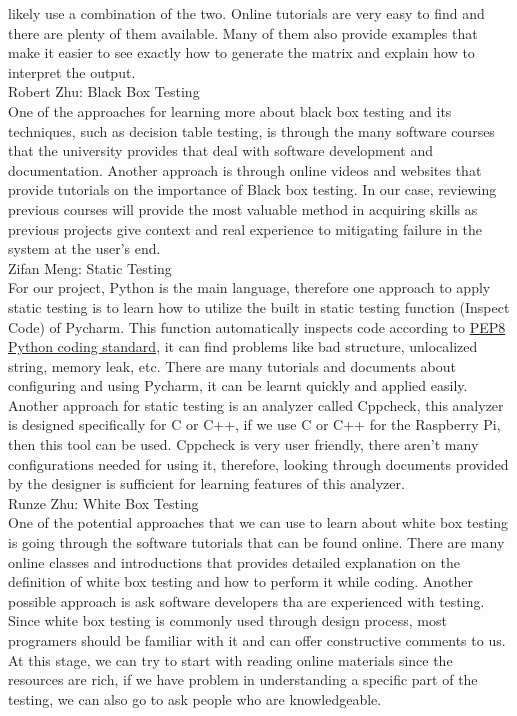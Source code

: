 \documentclass[12pt]{article}
\begin{document}
\begin{outline}[enumerate]
    likely use a combination of the two. Online tutorials are very easy to find and there are plenty of them available. Many of them also provide examples that make it 
    easier to see exactly how to generate the matrix and explain how to interpret the output.\\
    \2 Robert Zhu: Black Box Testing\\
    One of the approaches for learning more about black box testing and its techniques, such as decision table testing, is through the many software courses that the university 
    provides that deal with software development and documentation. Another approach is through online videos and websites that provide tutorials on the importance of Black box testing. 
    In our case, reviewing previous courses will provide the most valuable method in acquiring skills as previous projects give context and real experience to mitigating failure in 
    the system at the user’s end.\\
    \2 Zifan Meng: Static Testing\\
    For our project, Python is the main language, therefore one approach to apply static testing is to learn how to utilize the built in static testing function (Inspect Code) of Pycharm. This function automatically inspects code according to \href{https://peps.python.org/pep-0008/}{PEP8 Python coding standard}, it can find problems like bad structure, unlocalized string, memory leak, etc. There are many tutorials and documents about configuring and using Pycharm, it can be learnt quickly and applied easily. Another approach for static testing is an analyzer called Cppcheck, this analyzer is designed specifically for C or C++, if we use C or C++ for the Raspberry Pi, then this tool can be used. Cppcheck is very user friendly, there aren’t many configurations needed for using it, therefore, looking through documents provided by the designer is sufficient for learning features of this analyzer.\\
    \2 Runze Zhu: White Box Testing\\
    One of the potential approaches that we can use to learn about white box testing is going through the software tutorials that can be found online. There are many online classes and introductions that provides detailed explanation on the definition of white box testing and how to perform it while coding. Another possible approach is ask software developers tha are experienced with testing. Since white box testing is commonly used through design process, most programers should be familiar with it and can offer constructive comments to us. At this stage, we can try to start with reading online materials since the resources are rich, if we have problem in understanding a specific part of the testing, we can also go to ask people who are knowledgeable.

  
\end{outline}
\end{document}

